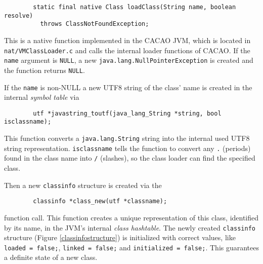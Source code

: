 \begin{verbatim}
        static final native Class loadClass(String name, boolean resolve)
          throws ClassNotFoundException;
\end{verbatim}

\begingroup
{}
This is a native function implemented in the CACAO JVM, which is
located in \texttt{nat/VMClassLoader.c} and calls the internal loader
functions of CACAO. If the \texttt{name} argument is \texttt{NULL}, a
new \texttt{java.lang.NullPointerException} is created and the
function returns \texttt{NULL}.

\endgroup

If the \texttt{name} is non-NULL a new UTF8 string of the class' name
is created in the internal \textit{symbol table} via

\begin{verbatim}
        utf *javastring_toutf(java_lang_String *string, bool isclassname);
\end{verbatim}

This function converts a \texttt{java.lang.String} string into the
internal used UTF8 string representation. \texttt{isclassname} tells
the function to convert any \texttt{.} (periods) found in the class
name into \texttt{/} (slashes), so the class loader can find the
specified class.

Then a new \texttt{classinfo} structure is created via the

\begin{verbatim}
        classinfo *class_new(utf *classname);
\end{verbatim}

function call. This function creates a unique representation of this
class, identified by its name, in the JVM's internal \textit{class
hashtable}. The newly created \texttt{classinfo} structure (Figure
\ref{classinfostructure}) is initialized with correct values, like
\texttt{loaded = false;}, \texttt{linked = false;} and
\texttt{initialized = false;}. This guarantees a definite state of a
new class.

